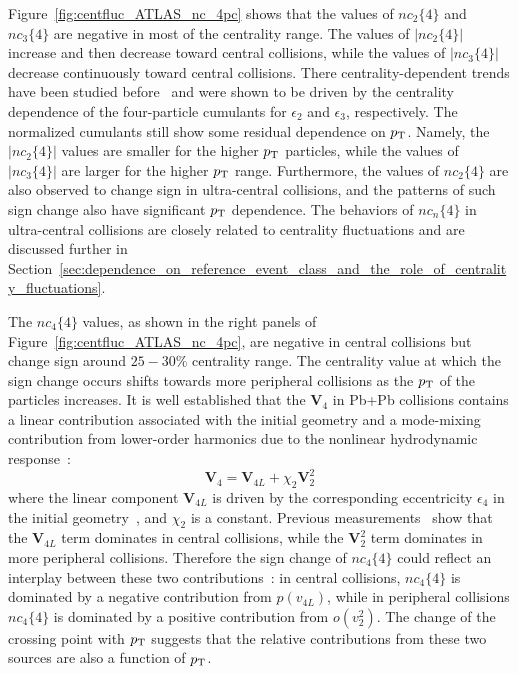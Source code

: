 Figure~\ref{fig:centfluc_ATLAS_nc_4pc} shows that the values of $nc_2\{4\}$ and $nc_3\{4\}$ are negative in most of the centrality range. The values of $|nc_2\{4\}|$ increase and then decrease toward central collisions, while the values of $|nc_3\{4\}|$ decrease continuously toward central collisions. There centrality-dependent trends have been studied before~\cite{Aad:2014vba, Abelev:2014mda, Alver:2008zza} and were shown to be driven by the centrality dependence of the four-particle cumulants for $\epsilon_2$ and $\epsilon_3$, respectively. The normalized cumulants still show some residual dependence on $p_\text{T}$. Namely, the $|nc_2\{4\}|$ values are smaller for the higher $p_\text{T}$ particles, while the values of $|nc_3\{4\}|$ are larger for the higher $p_\text{T}$ range. Furthermore, the values of $nc_2\{4\}$ are also observed to change sign in ultra-central collisions, and the patterns of such sign change also have significant $p_\text{T}$ dependence. The behaviors of $nc_n\{4\}$ in ultra-central collisions are closely related to centrality fluctuations and are discussed further in Section~\ref{sec:dependence_on_reference_event_class_and_the_role_of_centrality_fluctuations}.

The $nc_4\{4\}$ values, as shown in the right panels of Figure~\ref{fig:centfluc_ATLAS_nc_4pc}, are negative in central collisions but change sign around $25-30\%$ centrality range. The centrality value at which the sign change occurs shifts towards more peripheral collisions as the $p_\text{T}$ of the particles increases. It is well established that the $\pmb{V}_4$ in Pb+Pb collisions contains a linear contribution associated with the initial geometry and a mode-mixing contribution from lower-order harmonics due to the nonlinear hydrodynamic response~\cite{Gardim:2011xv, Aad:2014fla, Aad:2015lwa, Qiu:2012uy, Teaney:2012ke}:
\begin{equation}
\pmb{V}_4 = \pmb{V}_{4L} + \chi_2 \pmb{V}_2^2
\end{equation}
where the linear component $\pmb{V}_{4L}$ is driven by the corresponding eccentricity $\epsilon_4$ in the initial geometry~\cite{Teaney:2010vd}, and $\chi_2$ is a constant. Previous measurements~\cite{Aad:2014fla, Aad:2015lwa} show that the $\pmb{V}_{4L}$ term dominates in central collisions, while the $\pmb{V}_2^2$ term dominates in more peripheral collisions. Therefore the sign change of $nc_4\{4\}$ could reflect an interplay between these two contributions~\cite{Giacalone:2016mdr}: in central collisions, $nc_4\{4\}$ is dominated by a negative contribution from $p(v_{4L})$, while in peripheral collisions $nc_4\{4\}$ is dominated by a positive contribution from $o(v_2^2)$. The change of the crossing point with $p_\text{T}$ suggests that the relative contributions from these two sources are also a function of $p_\text{T}$.

